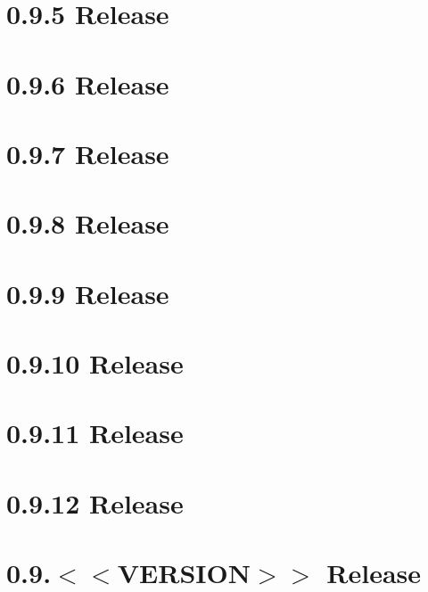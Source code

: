 \let\mypdfximage\pdfximage\def\pdfximage{\immediate\mypdfximage}\documentclass[twoside]{book}
\newcommand{\+}{\discretionary{\mbox{\scriptsize$\hookleftarrow$}}{}{}}
\begin{document}
\chapter{0.9.5 Release}
\label{doc_news_2021-04-12_0_9_5_md}

\chapter{0.9.6 Release}
\label{doc_news_2021-06-07_0_9_6_md}

\chapter{0.9.7 Release}
\label{doc_news_2021-07-09_0_9_7_md}

\chapter{0.9.8 Release}
\label{doc_news_2021-10-04_0_9_8_md}

\chapter{0.9.9 Release}
\label{doc_news_2022-03-10_0_9_9_md}

\chapter{0.9.10 Release}
\label{doc_news_2022-07-11_0_9_10_md}

\chapter{0.9.11 Release}
\label{doc_news_2022-10-05_0_9_11_md}

\chapter{0.9.12 Release}
\label{doc_news_2023-03-03_0_9_12_md}

\chapter{0.9.$<$$<$VERSION$>$$>$ Release}
\label{doc_news__preparation_next_release_md}

\end{document}
